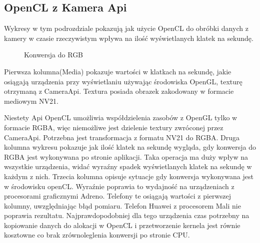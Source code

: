 \subsection[OpenCL z Kamera Api]{OpenCL z Kamera Api}
Wykresy w tym podrozdziale pokazują jak użycie OpenCL do obróbki danych z kamery w czasie rzeczywistym wpływa na ilość wyświetlanych klatek na sekundę.
\begin{figure}[H]
\caption{Konwersja do RGB}
\end{figure}

Pierwsza kolumna(Media) pokazuje wartości w klatkach na sekundę, jakie osiągają urządzenia przy wyświetlaniu używając środowiska OpenGL, texturę otrzymaną z CameraApi. Textura posiada obrazek zakodowany w formacie mediowym NV21.

Niestety Api OpenCL umożliwia współdzielenia zasobów z OpenGL tylko w formacie RGBA, więc niemożliwe jest dzielenie textury zwróconej przez CameraApi. Potrzebna jest transformacja z formatu NV21 do RGBA. Druga kolumna wykresu pokazuje jak ilość klatek na sekundę wygląda, gdy konwersja do RGBA jest wykonywana po stronie aplikacji. Taka operacja ma duży wpływ na wszystkie urządzenia, widać wyraźny spadek wyświetlanych klatek na sekundę w każdym z nich. Trzecia kolumna opisuje sytuacje gdy konwersja wykonywana jest w środowisku openCL. Wyraźnie poprawia to wydajność na urządzeniach z procesorami graficznymi Adreno. Telefony te osiągają wartości z pierwszej kolumny, uwzględniając błąd pomiaru. Telefon Huawei z procesorem Mali nie poprawia rezultatu. Najprawdopodobniej dla tego urządzenia czas potrzebny na kopiowanie danych do alokacji w OpenCL i przetworzenie kernela jest równie kosztowne co brak zrównoleglenia konwersji po stronie CPU. 

